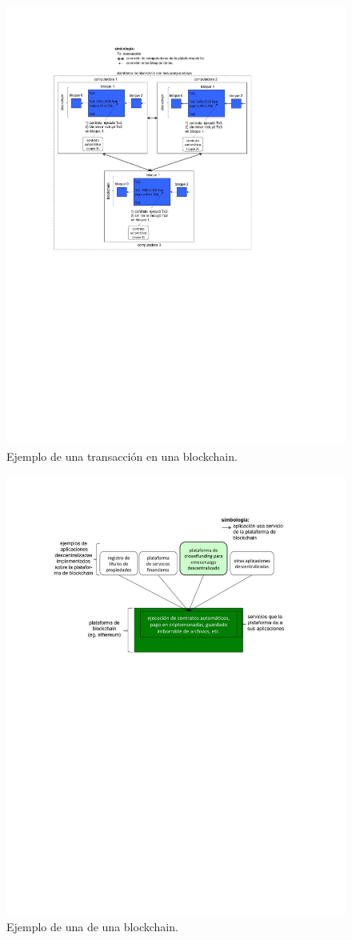 \documentclass[12pt]{report} %
\begin{document}
\begin{figure}
\centering
\includegraphics[width=0.85\columnwidth]{imagenes/ejtransaccionbc.pdf}
\caption{Ejemplo de una transacción en una blockchain.}
\label{ejtransaccionbc}
\end{figure} 


\begin{figure}
\centering
\includegraphics[width=0.85\columnwidth]{ejemplobcotra (pdf.io).pdf}
\caption{Ejemplo de una de una blockchain.}
\label{ejemplobcotra}
\end{figure} 
\end{document}
